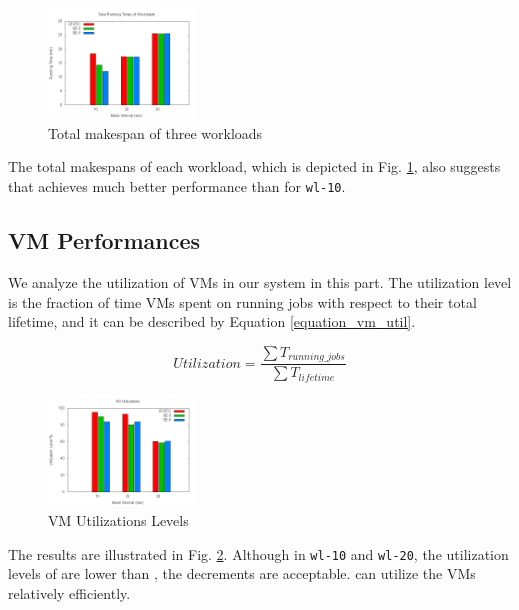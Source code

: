 \begin{figure}[!t]
\centering
\includegraphics[width=0.35\textwidth]{pictures/workload-runtime.png}
\caption{Total makespan of three workloads}
\label{figure_workloadmakespan}
\end{figure}

The total makespans of each workload, which is depicted in Fig.
\ref{figure_workloadmakespan}, also suggests that \SE{}
achieves much better performance than \STATIC{} for \texttt{wl-10}.


\subsection{VM Performances}\label{section_vm_performance}
We analyze the utilization of VMs in our system in this part. The
utilization level is the fraction of time VMs spent on running jobs
with respect to their total lifetime, and it can be described by
Equation \ref{equation_vm_util}.

\begin{equation}
\label{equation_vm_util}
Utilization = \frac{\sum{T_{running\_jobs}}}{\sum{T_{lifetime}}}
\end{equation}

\begin{figure}[!t]
\centering
\includegraphics[width=0.35\textwidth]{pictures/vm-util.png}
\caption{VM Utilizations Levels}
\label{figure_vm_util}
\end{figure}

The results are illustrated in Fig. \ref{figure_vm_util}. Although in
\texttt{wl-10} and \texttt{wl-20}, the utilization levels of \SE{} are
lower than \STATIC{}, the decrements are acceptable. \SE{} can utilize
the VMs relatively efficiently.

